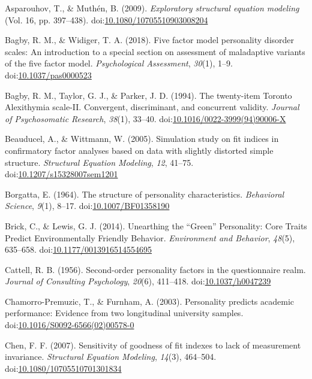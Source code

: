 \documentclass[,man,floatsintext]{apa6}
\begin{document}
\hypertarget{ref-AsparouhovMuthen2009}{}
Asparouhov, T., \& Muthén, B. (2009). \emph{Exploratory structural
equation modeling} (Vol. 16, pp. 397--438).
doi:\href{https://doi.org/10.1080/10705510903008204}{10.1080/10705510903008204}

\hypertarget{ref-Bagby2018}{}
Bagby, R. M., \& Widiger, T. A. (2018). Five factor model personality
disorder scales: An introduction to a special section on assessment of
maladaptive variants of the five factor model. \emph{Psychological
Assessment}, \emph{30}(1), 1--9.
doi:\href{https://doi.org/10.1037/pas0000523}{10.1037/pas0000523}

\hypertarget{ref-Bagby1994}{}
Bagby, R. M., Taylor, G. J., \& Parker, J. D. (1994). The twenty-item
Toronto Alexithymia scale-II. Convergent, discriminant, and concurrent
validity. \emph{Journal of Psychosomatic Research}, \emph{38}(1),
33--40.
doi:\href{https://doi.org/10.1016/0022-3999(94)90006-X}{10.1016/0022-3999(94)90006-X}

\hypertarget{ref-Beauducel2005}{}
Beauducel, A., \& Wittmann, W. (2005). Simulation study on fit indices
in confirmatory factor analyses based on data with slightly distorted
simple structure. \emph{Structural Equation Modeling}, \emph{12},
41--75.
doi:\href{https://doi.org/10.1207/s15328007sem1201}{10.1207/s15328007sem1201}

\hypertarget{ref-Borgatta1964}{}
Borgatta, E. (1964). The structure of personality characteristics.
\emph{Behavioral Science}, \emph{9}(1), 8--17.
doi:\href{https://doi.org/10.1007/BF01358190}{10.1007/BF01358190}

\hypertarget{ref-Brick2014}{}
Brick, C., \& Lewis, G. J. (2014). Unearthing the ``Green'' Personality:
Core Traits Predict Environmentally Friendly Behavior. \emph{Environment
and Behavior}, \emph{48}(5), 635--658.
doi:\href{https://doi.org/10.1177/0013916514554695}{10.1177/0013916514554695}

\hypertarget{ref-Cattell1956}{}
Cattell, R. B. (1956). Second-order personality factors in the
questionnaire realm. \emph{Journal of Consulting Psychology},
\emph{20}(6), 411--418.
doi:\href{https://doi.org/10.1037/h0047239}{10.1037/h0047239}

\hypertarget{ref-Chamorro-Premuzic2003}{}
Chamorro-Premuzic, T., \& Furnham, A. (2003). Personality predicts
academic performance: Evidence from two longitudinal university samples.
doi:\href{https://doi.org/10.1016/S0092-6566(02)00578-0}{10.1016/S0092-6566(02)00578-0}

\hypertarget{ref-Chen2007}{}
Chen, F. F. (2007). Sensitivity of goodness of fit indexes to lack of
measurement invariance. \emph{Structural Equation Modeling},
\emph{14}(3), 464--504.
doi:\href{https://doi.org/10.1080/10705510701301834}{10.1080/10705510701301834}
\end{document}
